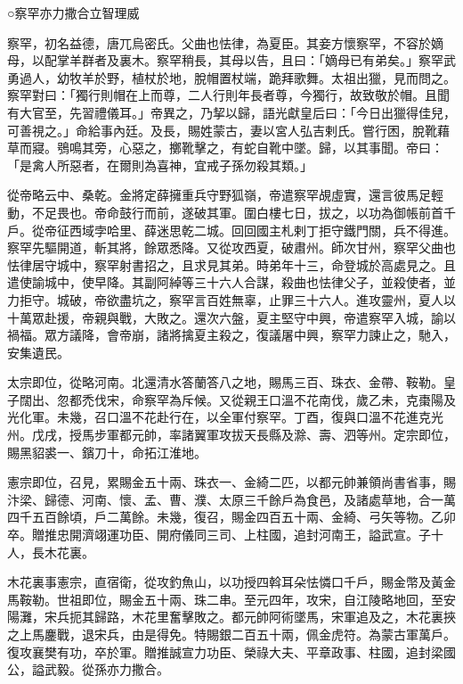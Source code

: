
\begin{pinyinscope}

 ○察罕亦力撒合立智理威



 察罕，初名益德，唐兀烏密氏。父曲也怯律，為夏臣。其妾方懷察罕，不容於嫡母，以配掌羊群者及裏木。察罕稍長，其母以告，且曰：「嫡母已有弟矣。」察罕武勇過人，幼牧羊於野，植杖於地，脫帽置杖端，跪拜歌舞。太祖出獵，見而問之。察罕對曰：「獨行則帽在上而尊，二人行則年長者尊，今獨行，故致敬於帽。且聞有大官至，先習禮儀耳。」帝異之，乃挈以歸，語光獻皇后曰：「今日出獵得佳兒，可善視之。」命給事內廷。及長，賜姓蒙古，妻以宮人弘吉剌氏。嘗行困，脫靴藉草而寢。鴞鳴其旁，心惡之，擲靴擊之，有蛇自靴中墜。歸，以其事聞。帝曰：「是禽人所惡者，在爾則為喜神，宜戒子孫勿殺其類。」



 從帝略云中、桑乾。金將定薛擁重兵守野狐嶺，帝遣察罕覘虛實，還言彼馬足輕動，不足畏也。帝命鼓行而前，遂破其軍。圍白樓七日，拔之，以功為御帳前首千戶。從帝征西域孛哈里、薛迷思乾二城。回回國主札剌丁拒守鐵門關，兵不得進。察罕先驅開道，斬其將，餘眾悉降。又從攻西夏，破肅州。師次甘州，察罕父曲也怯律居守城中，察罕射書招之，且求見其弟。時弟年十三，命登城於高處見之。且遣使諭城中，使早降。其副阿綽等三十六人合謀，殺曲也怯律父子，並殺使者，並力拒守。城破，帝欲盡坑之，察罕言百姓無辜，止罪三十六人。進攻靈州，夏人以十萬眾赴援，帝親與戰，大敗之。還次六盤，夏主堅守中興，帝遣察罕入城，諭以禍福。眾方議降，會帝崩，諸將擒夏主殺之，復議屠中興，察罕力諫止之，馳入，安集遺民。



 太宗即位，從略河南。北還清水答蘭答八之地，賜馬三百、珠衣、金帶、鞍勒。皇子闊出、忽都禿伐宋，命察罕為斥候。又從親王口溫不花南伐，歲乙未，克棗陽及光化軍。未幾，召口溫不花赴行在，以全軍付察罕。丁酉，復與口溫不花進克光州。戊戌，授馬步軍都元帥，率諸翼軍攻拔天長縣及滁、壽、泗等州。定宗即位，賜黑貂裘一、鑌刀十，命拓江淮地。



 憲宗即位，召見，累賜金五十兩、珠衣一、金綺二匹，以都元帥兼領尚書省事，賜汴梁、歸德、河南、懷、孟、曹、濮、太原三千餘戶為食邑，及諸處草地，合一萬四千五百餘頃，戶二萬餘。未幾，復召，賜金四百五十兩、金綺、弓矢等物。乙卯卒。贈推忠開濟翊運功臣、開府儀同三司、上柱國，追封河南王，謚武宣。子十人，長木花裏。



 木花裏事憲宗，直宿衛，從攻釣魚山，以功授四斡耳朵怯憐口千戶，賜金幣及黃金馬鞍勒。世祖即位，賜金五十兩、珠二串。至元四年，攻宋，自江陵略地回，至安陽灘，宋兵扼其歸路，木花里奮擊敗之。都元帥阿術墜馬，宋軍追及之，木花裏挾之上馬鏖戰，退宋兵，由是得免。特賜銀二百五十兩，佩金虎符。為蒙古軍萬戶。復攻襄樊有功，卒於軍。贈推誠宣力功臣、榮祿大夫、平章政事、柱國，追封梁國公，謚武毅。從孫亦力撒合。




\end{pinyinscope}
